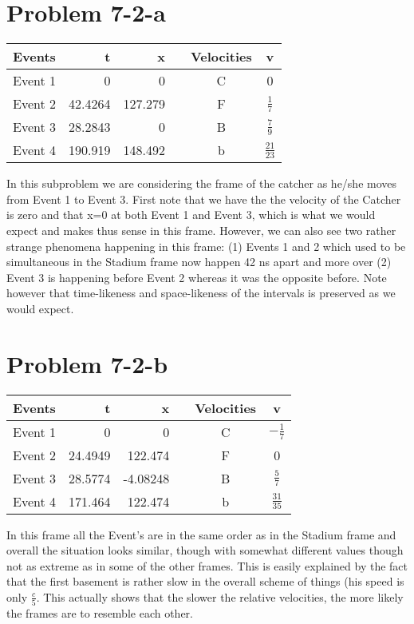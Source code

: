 \section*{Problem 7-2-a}
\begin{center}
\begin{tabular}{ l || r | r  r  c || c }
  Events & t & x && Velocities & v \\ \hline
  Event 1 &    		  0  & 0 			&& C & 0 \\
  Event 2 &  42.4264  & 127.279 && F & $\frac{1}{7}$\\
  Event 3 &  28.2843  & 0				&& B & $\frac{7}{9}$\\
  Event 4 &  190.919  & 148.492 && b & $\frac{21}{23}$
\end{tabular}
\end{center}
In this subproblem we are considering the frame of the catcher as he/she moves from Event 1 to Event 3. First note that we have the the velocity of the Catcher is zero and that x=0 at both Event 1 and Event 3, which is what we would expect and makes thus sense in this frame. However, we can also see two rather strange phenomena happening in this frame: (1) Events 1 and 2 which used to be simultaneous in the Stadium frame now happen 42 ns apart and more over (2) Event 3 is happening before Event 2 whereas it was the opposite before. Note however that time-likeness and space-likeness of the intervals is preserved as we would expect.
\section*{Problem 7-2-b}
\begin{center}
\begin{tabular}{ l || r | r  r  c || c }
  Events & t & x && Velocities & v \\ \hline
  Event 1 &    		  0  & 0 			&& C & $-\frac{1}{7}$ \\
  Event 2 &  24.4949  & 122.474 && F & 0\\
  Event 3 &  28.5774  & -4.08248			&& B & $\frac{5}{7}$\\
  Event 4 &  171.464  & 122.474 && b & $\frac{31}{35}$
\end{tabular}
\end{center}
In this frame all the Event's are in the same order as in the Stadium frame and overall the situation looks similar, though with  somewhat different values though not as extreme as in some of the other frames. This is easily explained by the fact that the first basement is rather slow in the overall scheme of things (his speed is only $\frac{c}{5}$. This actually shows that the slower the relative velocities, the more likely the frames are to resemble each other. 
